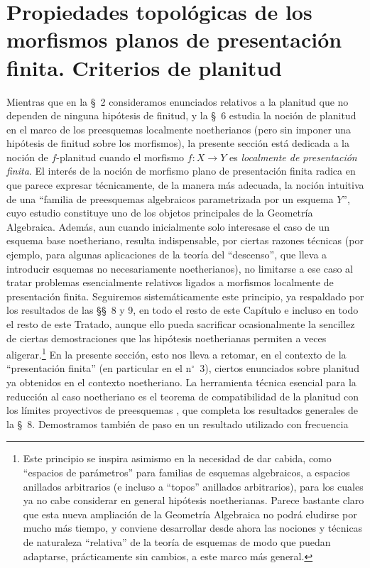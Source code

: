 \setcounter{section}{10}
\section{Propiedades topológicas de los morfismos planos de presentación finita. Criterios de planitud}
\label{section:IV.11}


Mientras que en la \S~2 consideramos enunciados relativos a la planitud que no dependen
de ninguna hipótesis de finitud, y la \S~6 estudia la noción de planitud en el
marco de los preesquemas localmente noetherianos (pero sin imponer una hipótesis de finitud
sobre los morfismos), la presente sección está dedicada a la noción de
$f$-planitud cuando el morfismo $f:X\to Y$ es \emph{localmente de presentación
finita}. El interés de la noción de morfismo plano de presentación finita
radica en que parece expresar técnicamente, de la manera más adecuada, la noción
intuitiva de una ``familia de preesquemas algebraicos parametrizada por un esquema
$Y$'', cuyo estudio constituye uno de los objetos principales de la
Geometría Algebraica. Además, aun cuando inicialmente solo interesase el caso
de un esquema base noetheriano, resulta indispensable, por ciertas razones
técnicas (por ejemplo, para algunas aplicaciones de la teoría del
``descenso'', que lleva a introducir esquemas no necesariamente
noetherianos), no limitarse a ese caso al tratar problemas esencialmente
relativos ligados a morfismos localmente de presentación finita. Seguiremos
sistemáticamente este principio, ya respaldado por los resultados de las \S\S~8 y 9,
en todo el resto de este Capítulo e incluso en todo el resto de este Tratado,
aunque ello pueda sacrificar ocasionalmente la sencillez de ciertas demostraciones
que las hipótesis noetherianas permiten a veces aligerar.\footnote{Este principio
se inspira asimismo en la necesidad de dar cabida, como ``espacios de parámetros''
para familias de esquemas algebraicos, a espacios anillados arbitrarios (e incluso
a ``topos'' anillados arbitrarios), para los cuales ya no cabe considerar en general
hipótesis noetherianas. Parece bastante claro que esta nueva ampliación de la
Geometría Algebraica no podrá eludirse por mucho más tiempo, y conviene desarrollar
desde ahora las nociones y técnicas de naturaleza ``relativa'' de la teoría de
esquemas de modo que puedan adaptarse, prácticamente sin cambios, a este marco más
general.} En la presente sección, esto nos lleva a retomar, en el contexto de la
``presentación finita'' (en particular en el n$^\circ$~3), ciertos enunciados sobre
planitud ya obtenidos en el contexto noetheriano. La herramienta técnica esencial
para la reducción al caso noetheriano es el teorema de compatibilidad de la
planitud con los límites proyectivos de preesquemas , que completa
los resultados generales de la \S~8. Demostramos también de paso en 
un resultado utilizado con frecuencia

